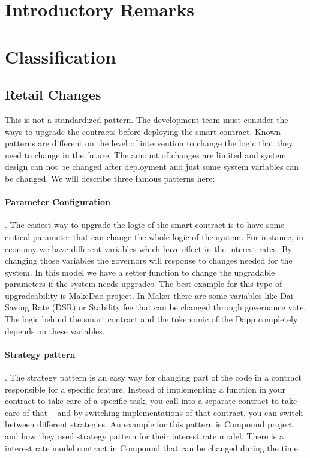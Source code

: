 

\section{Introductory Remarks}



\section{Classification}

\subsection{Retail Changes}
This is not a standardized pattern. The development team must consider the ways to upgrade the contracts before deploying the smart contract. Known patterns are different on the level of intervention to change the logic that they need to change in the future. The amount of changes are limited and system design can not be changed after deployment and just some system variables can be changed. We will describe three famous patterns here:

\paragraph{Parameter Configuration}. The easiest way to upgrade the logic of the smart contract is to have some critical parameter that can change the whole logic of the system. For instance, in economy we have different variables which have effect in the interest rates. By changing those variables the governors will response to changes needed for the system. 
In this model we have a setter function to change the upgradable parameters if the system needs upgrades. The best example for this type of upgradeability is MakeDao project. In Maker there are some variables like Dai Saving Rate (DSR) or Stability fee that can be changed through governance vote. The logic behind the smart contract and the tokenomic of the Dapp completely depends on these variables.

\paragraph{Strategy pattern}. The strategy pattern is an easy way for changing part of the code in a contract responsible for a specific feature. Instead of implementing a function in your contract to take care of a specific task, you call into a separate contract to take care of that – and by switching implementations of that contract, you can switch between different strategies.
An example for this pattern is Compound project and how they used strategy pattern for their interest rate model. There is a interest rate model contract in Compound that can be changed during the time. 

